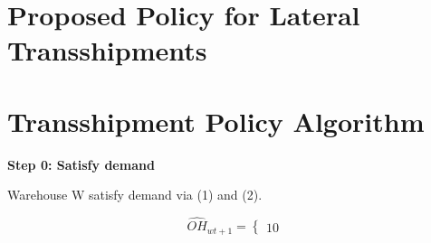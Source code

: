 \documentclass[../../main.tex]{subfiles}
\begin{document}



\section{Proposed Policy for Lateral Transshipments}
\section{Transshipment Policy Algorithm}

\textbf{Step 0: Satisfy demand}

Warehouse W satisfy demand via (1) and (2).

\[
\hat{OH}_{wt+1} =
\begin{cases}
1
0
\end{cases}

\]




\end{document}
